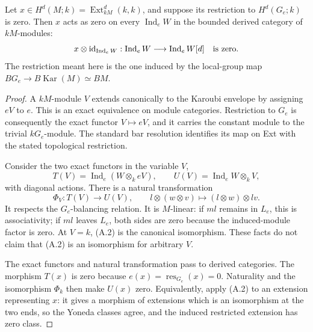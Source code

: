 \begin{lemma}\label{A:action-induction}
Let $x\in H^d(M;k)=\operatorname{Ext}_{kM}^d(k,k)$, and suppose its
restriction to $H^d(G_e;k)$ is zero. Then $x$ acts as zero on every
$\operatorname{Ind}_eW$ in the bounded derived category of $kM$-modules:
\[
 x\otimes\operatorname{id}_{\operatorname{Ind}_eW}:
 \operatorname{Ind}_eW\longrightarrow\operatorname{Ind}_eW[d]
 \quad\hbox{is zero}.
\]
The restriction meant here is the one induced by the local-group map
$BG_e\to B\operatorname{Kar}(M)\simeq BM$.
\end{lemma}
\begin{proof}
A $kM$-module $V$ extends canonically to the Karoubi envelope by assigning
$eV$ to $e$. This is an exact equivalence on module categories. Restriction
to $G_e$ is consequently the exact functor $V\mapsto eV$, and it carries
the constant module to the trivial $kG_e$-module. The standard bar resolution
identifies its map on Ext with the stated topological restriction.

Consider the two exact functors in the variable $V$,
\[
 T(V)=\operatorname{Ind}_e(W\otimes_k eV),\qquad
 U(V)=\operatorname{Ind}_eW\otimes_k V,
\]
with diagonal actions. There is a natural transformation
\[
 \Phi_V:T(V)\longrightarrow U(V),\qquad
 l\otimes(w\otimes v)\longmapsto(l\otimes w)\otimes lv.       \tag{A.2}
\]
It respects the $G_e$-balancing relation. It is $M$-linear: if $ml$ remains
in $L_e$, this is associativity; if $ml$ leaves $L_e$, both sides are zero
because the induced-module factor is zero. At $V=k$, (A.2) is the canonical
isomorphism. These facts do not claim that (A.2) is an isomorphism for
arbitrary $V$.

The exact functors and natural transformation pass to derived categories.
The morphism $T(x)$ is zero because $e(x)=\operatorname{res}_{G_e}(x)=0$.
Naturality and the isomorphism $\Phi_k$ then make $U(x)$ zero. Equivalently,
apply (A.2) to an extension representing $x$: it gives a morphism of
extensions which is an isomorphism at the two ends, so the Yoneda classes
agree, and the induced restricted extension has zero class.
\end{proof}

